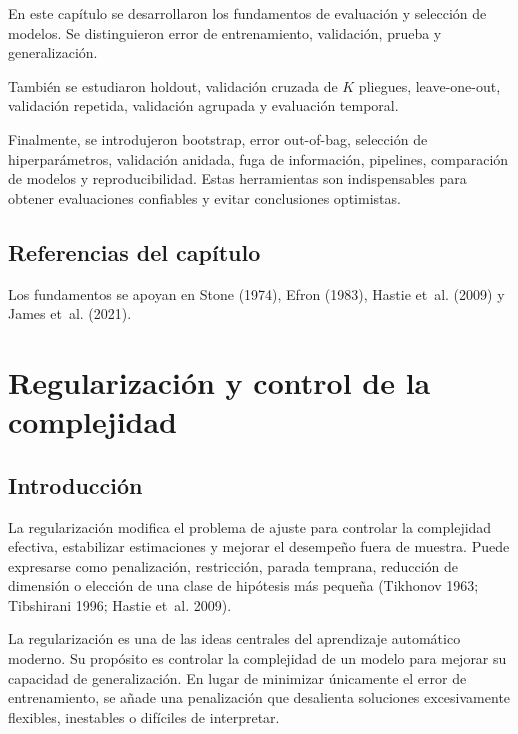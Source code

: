 \documentclass[
  spanish,
  10.5pt,
  letterpaper,
  DIV=11,
  numbers=noendperiod,
  oneside,
  open=any]{scrreprt}
\theoremstyle{definition}
\theoremstyle{definition}
\theoremstyle{plain}
\theoremstyle{remark}
\begin{document}

En este capítulo se desarrollaron los fundamentos de evaluación y
selección de modelos. Se distinguieron error de entrenamiento,
validación, prueba y generalización.

También se estudiaron holdout, validación cruzada de \(K\) pliegues,
leave-one-out, validación repetida, validación agrupada y evaluación
temporal.

Finalmente, se introdujeron bootstrap, error out-of-bag, selección de
hiperparámetros, validación anidada, fuga de información, pipelines,
comparación de modelos y reproducibilidad. Estas herramientas son
indispensables para obtener evaluaciones confiables y evitar
conclusiones optimistas.

\section*{Referencias del capítulo}\label{referencias-del-capuxedtulo-6}


Los fundamentos se apoyan en Stone (1974), Efron (1983), Hastie et~al.
(2009) y James et~al. (2021).

\chapter{\texorpdfstring{Regularización y control
de la
complejidad}{Regularización y control de la complejidad}}\label{sec-regularizacion}

\section*{Introducción}\label{introducciuxf3n-8}


La regularización modifica el problema de ajuste para controlar la
complejidad efectiva, estabilizar estimaciones y mejorar el desempeño
fuera de muestra. Puede expresarse como penalización, restricción,
parada temprana, reducción de dimensión o elección de una clase de
hipótesis más pequeña (Tikhonov 1963; Tibshirani 1996; Hastie et~al.
2009).

La regularización es una de las ideas centrales del aprendizaje
automático moderno. Su propósito es controlar la complejidad de un
modelo para mejorar su capacidad de generalización. En lugar de
minimizar únicamente el error de entrenamiento, se añade una
penalización que desalienta soluciones excesivamente flexibles,
inestables o difíciles de interpretar.
\end{document}
